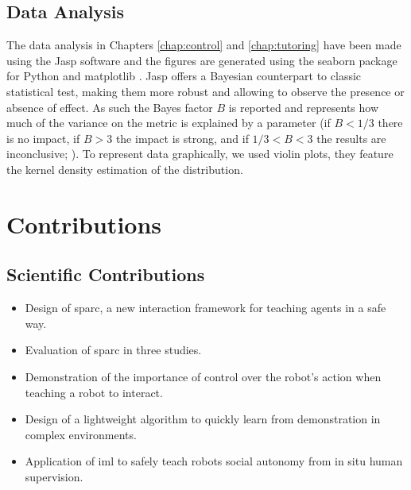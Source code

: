 \subsection{Data Analysis}

The data analysis in Chapters \ref{chap:control} and \ref{chap:tutoring} have been made using the Jasp software \cite{jasp2018} and the figures are generated using the seaborn package for Python and matplotlib \cite{waskom2017seaborn}. Jasp offers a Bayesian counterpart to classic statistical test, making them more robust and allowing to observe the presence or absence of effect. As such the Bayes factor $B$ is reported and represents how much of the variance on the metric is explained by a parameter (if $B < 1/3$ there is no impact, if $B > 3$ the impact is strong, and if $1/3<B<3$ the results are inconclusive; \citealt{jeffreys1998theory,dienes2011bayesian}). To represent data graphically, we used violin plots, they feature the kernel density estimation of the distribution.
%
%

\section{Contributions}\label{sec:intro-contr}

\subsection{Scientific Contributions}
\begin{itemize}
	\item Design of \gls{sparc}, a new interaction framework for teaching agents in a safe way.
	\item Evaluation of \gls{sparc} in three studies.
	\item Demonstration of the importance of control over the robot's action when teaching a robot to interact.
	\item Design of a lightweight algorithm to quickly learn from demonstration in complex environments.
	\item Application of \gls{iml} to safely teach robots social autonomy from in situ human supervision. 
\end{itemize}


